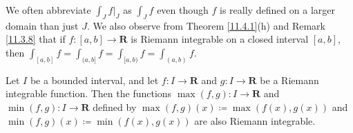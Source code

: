 \begin{remark}\label{11.4.2}
    We often abbreviate \(\int_J f|_J\) as \(\int_J f\) even though \(f\) is really defined on a larger domain than just \(J\).
    We also observe from Theorem \ref{11.4.1}(h) and Remark \ref{11.3.8} that if \(f : [a, b] \to \mathbf{R}\) is Riemann integrable on a closed interval \([a, b]\), then \(\int_{[a, b]} f = \int_{(a, b]} f = \int_{[a, b)} f = \int_{(a, b)} f\).
\end{remark}

\begin{theorem}\label{11.4.3}
    Let \(I\) be a bounded interval, and let \(f : I \to \mathbf{R}\) and \(g : I \to \mathbf{R}\) be a Riemann integrable function.
    Then the functions \(\max(f, g) : I \to \mathbf{R}\) and \(\min(f, g) : I \to \mathbf{R}\) defined by \(\max(f, g)(x) \coloneqq \max(f (x), g(x))\) and \(\min(f, g)(x) \coloneqq \min(f (x), g(x))\) are also Riemann integrable.
\end{theorem}

